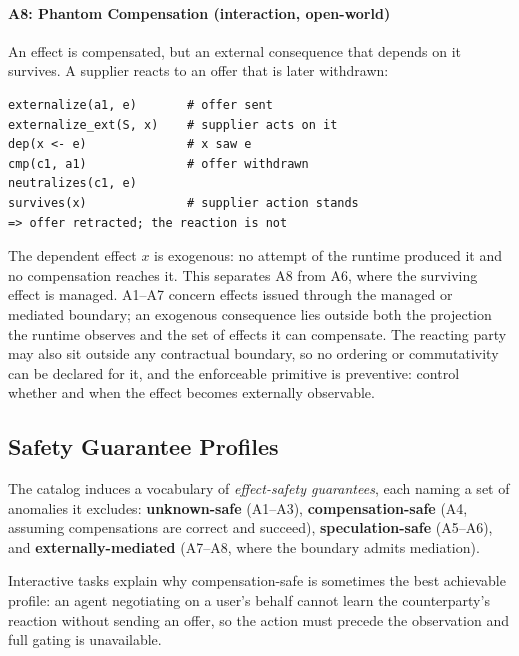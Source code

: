 \documentclass[runningheads]{comsis3}
\begin{document}
\paragraph{A8: Phantom Compensation (interaction, open-world)}
An effect is compensated, but an external consequence that depends
on it survives. A supplier reacts to an offer that is later withdrawn:
\par\medskip\noindent\begin{minipage}{\linewidth}
\begingroup\small\begin{verbatim}
externalize(a1, e)       # offer sent
externalize_ext(S, x)    # supplier acts on it
dep(x <- e)              # x saw e
cmp(c1, a1)              # offer withdrawn
neutralizes(c1, e)
survives(x)              # supplier action stands
=> offer retracted; the reaction is not
\end{verbatim}\endgroup
\end{minipage}\par\medskip\noindent
The dependent effect $x$ is exogenous: no attempt of the runtime produced it
and no compensation reaches it. This separates A8 from A6, where the
surviving effect is managed. A1--A7 concern effects issued through the managed or mediated boundary; an
exogenous consequence lies outside both the projection the runtime observes
and the set of effects it can compensate. The reacting party may
also sit outside any contractual boundary, so no ordering or commutativity
can be declared for it, and the enforceable primitive is preventive:
control whether and when the effect becomes externally observable.



\subsection{Safety Guarantee Profiles}
\label{sec:levels}

The catalog induces a vocabulary of \emph{effect-safety guarantees}, each
naming a set of anomalies it excludes: \textbf{unknown-safe} (A1--A3),
\textbf{compensation-safe} (A4, assuming compensations are correct and
succeed), \textbf{speculation-safe} (A5--A6), and
\textbf{externally-mediated} (A7--A8, where the boundary admits mediation).

Interactive tasks explain why compensation-safe is sometimes the best
achievable profile: an agent negotiating on a user's behalf cannot learn the
counterparty's reaction without sending an offer, so the action must precede
the observation and full gating is unavailable.
\end{document}
